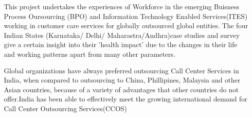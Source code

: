 This project undertakes the experiences of Workforce in the emerging Buisness Process Oursourcing (BPO) and Information Technology Enabled Services(ITES) working in customer care services for globally outsourced global entities. The four Indian States (Karnataka/ Delhi/ Maharastra/Andhra)case studies and survey give a certain insight into their 'health impact' due to the changes in their life and working patterns apart from many other parameters.

Global organizations have always preferred outsourcing Call Center Services in India, when compared to outsourcing to China, Phillipines, Malaysia and other Asian countries, because of a variety of advantages that other countries do not offer.India has been able to effectively meet the growing international demand for Call Center Outsourcing Services(CCOS)  
    